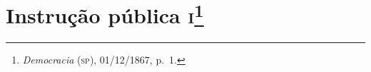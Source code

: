 
\chapter{Instrução pública \textsc{i}\footnote{\emph{Democracia} (\textsc{sp}),
  01/12/1867, p.~1.}}

